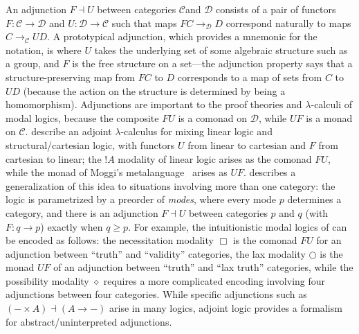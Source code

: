 \documentclass{drl-common/llncs}
\newcommand{\C}{\ensuremath{\mathcal{C}}}
\newcommand{\D}{\ensuremath{\mathcal{D}}}
\newcommand{\la}{\ensuremath{\dashv}}
\newcommand{\arrow}[3]{\ensuremath{#2 \longrightarrow_{#1} #3}}
\begin{document}
An adjunction $F \la U$ between categories \C and \D\/ consists of a
pair of functors $F : \C \to \D$ and $U : \D \to \C$ such that maps
\arrow{\D}{F C}{D} correspond naturally to maps \arrow{\C}{C}{U D}.  A
prototypical adjunction, which provides a mnemonic for the notation, is
where $U$ takes the underlying set of some algebraic structure such as a
group, and $F$ is the free structure on a set---the adjunction property
says that a structure-preserving map from $F C$ to $D$ corresponds to
a map of sets from $C$ to $U D$ (because the action on the structure is
determined by being a homomorphism).  Adjunctions are important to the
proof theories and $\lambda$-calculi of modal logics, because the
composite $FU$ is a comonad on \D, while $UF$ is a monad on $\C$.
\citet{bentonwadler96adjoint} describe an adjoint $\lambda$-calculus for
mixing linear logic and structural/cartesian logic, with functors $U$
from linear to cartesian and $F$ from cartesian to linear; the $! A$
modality of linear logic arises as the comonad $FU$, while the monad of
Moggi's metalanguage~\citep{moggi91monad} arises as $UF$.
\citet{reed09adjoint} describes a generalization of this idea to
situations involving more than one category: the logic is parametrized
by a preorder of \emph{modes}, where every mode $p$ determines a
category, and there is an adjunction $F \la U$ between categories $p$
and $q$ (with $F : q \to p$) exactly when $q \ge p$.  For example, the
intuitionistic modal logics of \citet{pfenningdavies} can be encoded as
follows: the necessitation modality $\Box$ is the comonad $FU$ for an
adjunction between ``truth'' and ``validity'' categories, the lax
modality $\bigcirc$ is the monad $UF$ of an adjunction between ``truth''
and ``lax truth'' categories, while the possibility modality $\diamond$
requires a more complicated encoding involving four adjunctions between
four categories.  While specific adjunctions such as $(- \times A) \la
(A \to -)$ arise in many logics, adjoint logic provides a formalism for
abstract/uninterpreted adjunctions.
\end{document}
